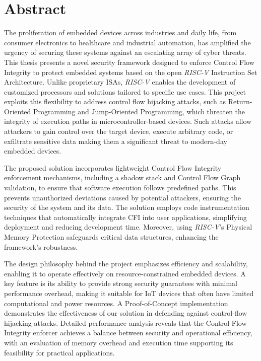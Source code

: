 \chapter*{Abstract}
\label{cha:abstract}

The proliferation of embedded devices across industries and daily life, from consumer
electronics to healthcare and industrial automation, has amplified the urgency
of securing these systems against an escalating array of cyber threats. This thesis
presents a novel security framework designed to enforce Control Flow Integrity to
protect embedded systems based on the open \textit{RISC-V} Instruction Set
Architecture. Unlike proprietary ISAs, \textit{RISC-V} enables the development of
customized processors and solutions tailored to specific use cases. This project
exploits this flexibility to address control flow hijacking attacks, such as Return-Oriented
Programming and Jump-Oriented Programming, which threaten the integrity of
execution paths in microcontroller-based devices. Such attacks allow attackers to
gain control over the target device, execute arbitrary code, or exfiltrate sensitive
data making them a significant threat to modern-day embedded devices.

The proposed solution incorporates lightweight Control Flow Integrity enforcement
mechanisms, including a shadow stack and Control Flow Graph validation, to ensure
that software execution follows predefined paths. This prevents unauthorized
deviations caused by potential attackers, ensuring the security of the system and
its data. The solution employs code instrumentation techniques that
automatically integrate CFI into user applications, simplifying deployment and reducing
development time. Moreover, using \textit{RISC-V}'s Physical Memory Protection
safeguards critical data structures, enhancing the framework's robustness.

The design philosophy behind the project emphasizes efficiency and scalability,
enabling it to operate effectively on resource-constrained embedded devices. A key
feature is its ability to provide strong security guarantees with minimal performance
overhead, making it suitable for IoT devices that often have limited
computational and power resources. A Proof-of-Concept implementation demonstrates
the effectiveness of our solution in defending against control-flow hijacking attacks.
Detailed performance analysis reveals that the Control Flow Integrity enforcer
achieves a balance between security and operational efficiency, with an evaluation
of memory overhead and execution time supporting its feasibility for practical applications.

